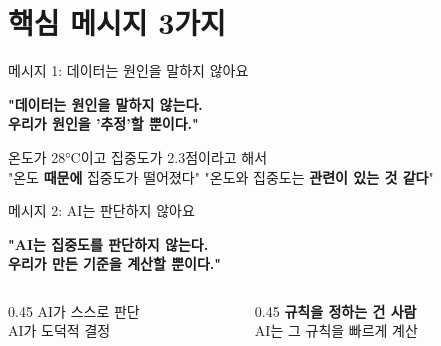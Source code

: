 \documentclass[aspectratio=169]{beamer}
\begin{document}
\section{ 핵심 메시지 3가지}

\begin{frame}{ 메시지 1: 데이터는 원인을 말하지 않아요}
\begin{center}
\Large
\begin{tcolorbox}[keybox]
  \centering
  \textbf{"데이터는 원인을 말하지 않는다.}\\
  \textbf{우리가 원인을 '추정'할 뿐이다."}
\end{tcolorbox}
\end{center}
\vspace{0.3cm}
온도가 28°C이고 집중도가 2.3점이라고 해서\\
\medskip
{} "온도 \textbf{때문에} 집중도가 떨어졌다" \hspace{0.5cm}
 "온도와 집중도는 \textbf{관련이 있는 것 같다}"
\end{frame}

\begin{frame}{ 메시지 2: AI는 판단하지 않아요}
\begin{center}
\begin{tcolorbox}[keybox]
  \centering
  \textbf{"AI는 집중도를 판단하지 않는다.}\\
  \textbf{우리가 만든 기준을 계산할 뿐이다."}
\end{tcolorbox}
\end{center}
\vspace{0.5cm}
\begin{columns}
  \begin{column}{0.45\textwidth}
     AI가 스스로 판단\\
     AI가 도덕적 결정
  \end{column}
  \begin{column}{0.45\textwidth}
     \textbf{규칙을 정하는 건 사람}\\
     AI는 그 규칙을 빠르게 계산
  \end{column}
\end{columns}
\end{frame}
\end{document}
